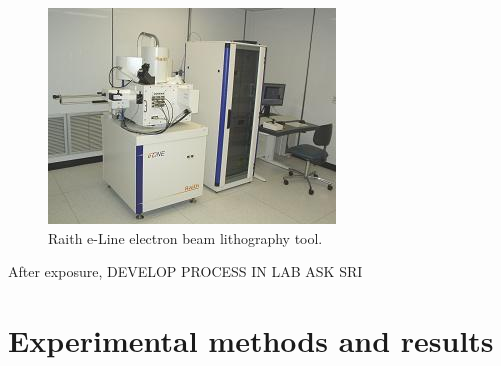 \documentclass[11 pt, oneside]{book} %
\begin{document}
\begin{figure}[h] 
   \centering
   \includegraphics[width=3in]{RaitheLine.jpg} 
   \caption[Raith e-Line]{Raith e-Line electron beam lithography tool.}
   \label{fig:Raith}
\end{figure}

After exposure, DEVELOP PROCESS IN LAB ASK SRI


\chapter{Experimental methods and results}\label{chap:Experimental}


\newpage



\end{document}
